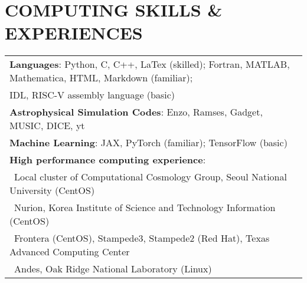 \documentclass[letterpaper,10pt]{article}
\newcommand{\tabitem}{{\textbullet}~}
\begin{document}
\section{\textbf{COMPUTING SKILLS \& EXPERIENCES}}
\begin{center}
\begin{tabular*}{0.97\textwidth}{l}
  \textbf{Languages}: Python, C, C++, LaTex (skilled); Fortran, MATLAB, Mathematica, HTML, Markdown (familiar);\\
  \hspace{0.73in} IDL, RISC-V assembly language (basic)\\
  \textbf{Astrophysical Simulation Codes}: Enzo, Ramses, Gadget, MUSIC, DICE, yt\\
  \textbf{Machine Learning}: JAX, PyTorch (familiar); TensorFlow (basic)\\
  \textbf{High performance computing experience}:\\
  \tabitem Local cluster of Computational Cosmology Group, Seoul National University (CentOS)\\
  \tabitem Nurion, Korea Institute of Science and Technology Information (CentOS)\\
  \tabitem Frontera (CentOS), Stampede3, Stampede2 (Red Hat), Texas Advanced Computing Center \\
  \tabitem Andes, Oak Ridge National Laboratory (Linux)\\
\end{tabular*}
\end{center}


\end{document}
